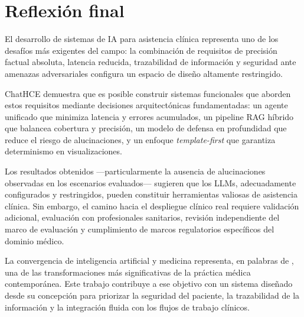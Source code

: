 \section{Reflexión final}
\label{sec:reflexion}

El desarrollo de sistemas de \ac{IA} para asistencia clínica representa uno de los desafíos más exigentes del campo: la combinación de requisitos de precisión factual absoluta, latencia reducida, trazabilidad de información y seguridad ante amenazas adversariales configura un espacio de diseño altamente restringido.

ChatHCE demuestra que es posible construir sistemas funcionales que aborden estos requisitos mediante decisiones arquitectónicas fundamentadas: un agente unificado que minimiza latencia y errores acumulados, un pipeline \ac{RAG} híbrido que balancea cobertura y precisión, un modelo de defensa en profundidad que reduce el riesgo de alucinaciones, y un enfoque \textit{template-first} que garantiza determinismo en visualizaciones.

Los resultados obtenidos ---particularmente la ausencia de alucinaciones observadas en los escenarios evaluados--- sugieren que los \ac{LLM}s, adecuadamente configurados y restringidos, pueden constituir herramientas valiosas de asistencia clínica. Sin embargo, el camino hacia el despliegue clínico real requiere validación adicional, evaluación con profesionales sanitarios, revisión independiente del marco de evaluación y cumplimiento de marcos regulatorios específicos del dominio médico.

La convergencia de inteligencia artificial y medicina representa, en palabras de \citet{Topol2019deepmedicine}, una de las transformaciones más significativas de la práctica médica contemporánea. Este trabajo contribuye a ese objetivo con un sistema diseñado desde su concepción para priorizar la seguridad del paciente, la trazabilidad de la información y la integración fluida con los flujos de trabajo clínicos.
